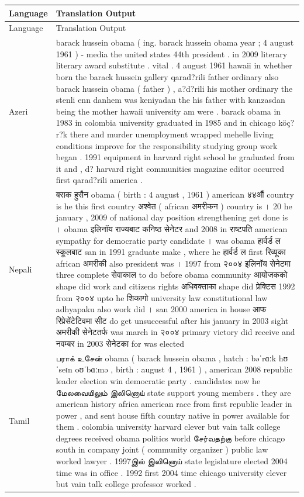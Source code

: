 \documentclass[11pt]{article}
\begin{document}
\onecolumn
\begin{center}
\begin{longtable}{|p{1.5cm}|p{13cm}|}
\hline
Language & Translation Output \\
\endfirsthead
\hline
Language & Translation Output \\
\endhead
\hline
Azeri & {barack hussein obama ( ing. barack hussein obama year ; 4 august 1961 ) - media the united states 44th president . 
in 2009 literary literary award substitute .  vital . 4 august 1961 hawaii in whether born the barack hussein gallery qarad?rili father ordinary also barack hussein obama ( father ) , a?d?rili his mother ordinary the stenli enn danhem was keniyadan the his father with kanzasdan being the mother hawaii university am were . barack obama in 1983 in colombia university graduated in 1985 and in chicago köç?r?k there and murder unemployment wrapped mehelle living conditions improve for the responsibility studying group work began . 1991 equipment in harvard right school he graduated from it and , d? harvard right communities magazine editor occurred first qarad?rili america .} \\
\hline
Nepali & {बराक हुसैन obama ( birth : 4 august , 1961 ) american ४४औं country is he this first country अश्वेत ( african अमरीकन ) country is । 20 he january , 2009 of national day position strengthening get done is । obama इलिनॉय राज्यबाट कनिष्ठ सेनेटर and 2008 in राष्टपति american sympathy for democratic party candidate । was obama हार्वर्ड ल स्कूलबाट san in 1991 graduate make , where he हार्वर्ड ल first रिव्यूका african अमरीकी also president was । 1997 from २००४ इलिनॉय सेनेटमा three complete सेवाकाल to do before obama community आयोजकको shape did work and citizens rights अधिवक्ताका shape did प्रेक्टिस 1992 from २००४ upto he शिकागो university law constitutional law adhyapaku also work did । san 2000 america in house आफ रिप्रेसेंटेटिवमा सीट do get unsuccessful after his january in 2003 sight अमरीकी सेनेटतर्फ was march in २००४ primary victory did receive and नवम्बर in 2003 सेनेटका for was elected}\\
\hline
Tamil & {பராக் உசேன் obama ( barack hussein obama , hatch : bəˈrɑːk hʊˈseɪn oʊˈbɑːmə , birth : august 4 , 1961 ) , american 2008 republic leader election win democratic party . candidates now he மேலவையிலும் இலினொய் state support young members . they are american history africa american race from first republic leader in power , and sent house fifth country native in power available for them . colombia university harvard clever but vain talk college degrees received obama politics world சேர்வதற்கு before chicago south in company joint ( community organizer ) public law worked lawyer . 1997இல் இலினொய் state legislature elected 2004 time was in office . 1992 first 2004 time chicago university clever but vain talk college professor worked .}\\

\end{longtable}
\end{center}
\end{document}
